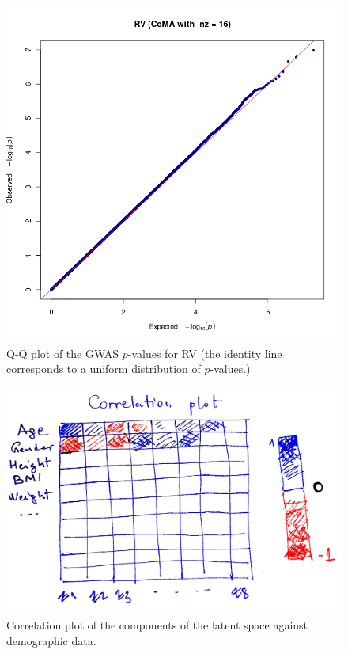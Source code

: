 \documentclass[twocolumn]{llncs}
\begin{document}
\begin{figure}
\includegraphics[width=\linewidth]{figs/gwas/2020-04-19_03_11_19_339030__RV__nz__16__gwas__qqplot__inv_norm__GBR.png}
\caption{Q-Q plot of the GWAS $p$-values for RV (the identity line corresponds to a uniform distribution of $p$-values.)}
\label{fig:qqplot_RV_pooled}
\end{figure}

\begin{figure}
\includegraphics[width=\linewidth]{figs/corrplot_z_vs_demographic_data.jpeg}
\caption{Correlation plot of the components of the latent space against demographic data.}
\end{figure}
\end{document}
